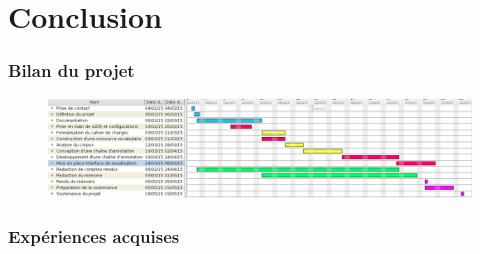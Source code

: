 \documentclass[a4paper, 11pt]{report}
\begin{document}
\part{Conclusion}
\section{Bilan du projet}
\begin{figure}[hbtp]
\includegraphics[scale=.3]{img/ganttEff.png}
\end{figure}

\section{Expériences acquises}
\end{document}

